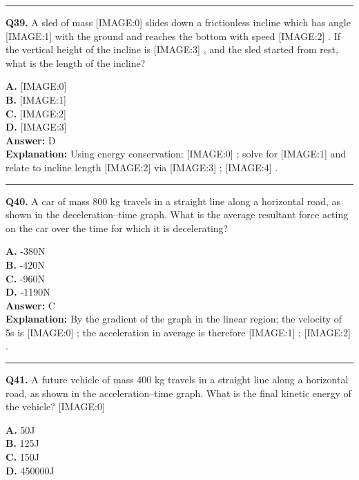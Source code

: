 \documentclass[12pt]{article}
\begin{document}
\hrule
\vspace{1em}


\noindent
\textbf{Q39.} A sled of mass
[IMAGE:0]
slides down a frictionless incline which has angle
[IMAGE:1]
with the ground and reaches the bottom with speed
[IMAGE:2]
. If the vertical height of the incline is
[IMAGE:3]
, and the sled started from rest, what is the length of the incline?



\textbf{A.} [IMAGE:0] \\
\textbf{B.} [IMAGE:1] \\
\textbf{C.} [IMAGE:2] \\
\textbf{D.} [IMAGE:3] \\

\textbf{Answer:} D \\
\textbf{Explanation:} Using energy conservation:
[IMAGE:0]
; solve for
[IMAGE:1]
and relate to incline length
[IMAGE:2]
via
[IMAGE:3]
;
[IMAGE:4]
.

\hrule
\vspace{1em}


\noindent
\textbf{Q40.} A car of mass 800 kg travels in a straight line along a horizontal road, as shown in the deceleration–time graph.
What is the average resultant force acting on the car over the time for which it is decelerating?



\textbf{A.} -380N \\
\textbf{B.} -420N \\
\textbf{C.} -960N \\
\textbf{D.} -1190N \\

\textbf{Answer:} C \\
\textbf{Explanation:} By the gradient of the graph in the linear region; the velocity of 5s is
[IMAGE:0]
; the acceleration in average is therefore
[IMAGE:1]
;
[IMAGE:2]
.

\hrule
\vspace{1em}


\noindent
\textbf{Q41.} A future vehicle of mass 400 kg travels in a straight line along a horizontal road, as shown in the acceleration–time graph.
What is the final kinetic energy of the vehicle?
[IMAGE:0]



\textbf{A.} 50J \\
\textbf{B.} 125J \\
\textbf{C.} 150J \\
\textbf{D.} 450000J \\
\end{document}
